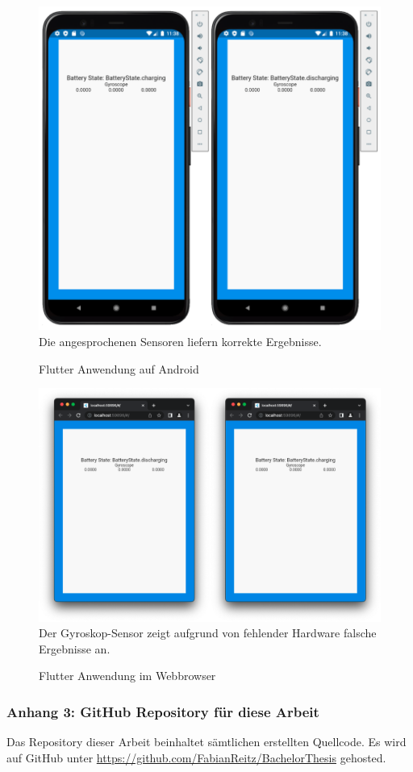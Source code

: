 \documentclass[a4paper]{scrartcl}
\begin{document}
\begin{figure}[H]
	\centering
	\caption{Flutter Anwendung auf Android}
	\includegraphics[scale=0.35]{_assets/Android_Flutter.png} \\
	Die angesprochenen Sensoren liefern korrekte Ergebnisse.
\end{figure}

\begin{figure}[H]
	\centering
	\caption{Flutter Anwendung im Webbrowser}
	\includegraphics[scale=0.25]{_assets/WebApp_Flutter.png} \\
	Der Gyroskop-Sensor zeigt aufgrund von fehlender Hardware falsche Ergebnisse an.
\end{figure}

\subsubsection*{Anhang 3: GitHub Repository für diese Arbeit}

Das Repository dieser Arbeit beinhaltet sämtlichen erstellten Quellcode. Es wird auf GitHub unter \url{https://github.com/FabianReitz/BachelorThesis} gehosted.
\end{document}
